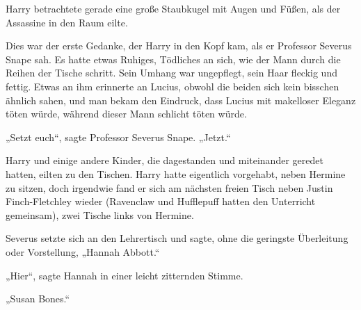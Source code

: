 Harry betrachtete gerade eine große Staubkugel mit Augen und Füßen, als der Assassine in den Raum eilte.

Dies war der erste Gedanke, der Harry in den Kopf kam, als er Professor Severus Snape sah. Es hatte etwas Ruhiges, Tödliches an sich, wie der Mann durch die Reihen der Tische schritt. Sein Umhang war ungepflegt, sein Haar fleckig und fettig. Etwas an ihm erinnerte an Lucius, obwohl die beiden sich kein bisschen ähnlich sahen, und man bekam den Eindruck, dass Lucius mit makelloser Eleganz töten würde, während dieser Mann schlicht töten würde.

„Setzt euch“, sagte Professor Severus Snape.
„Jetzt.“

Harry und einige andere Kinder, die dagestanden und miteinander geredet hatten, eilten zu den Tischen. Harry hatte eigentlich vorgehabt, neben Hermine zu sitzen, doch irgendwie fand er sich am nächsten freien Tisch neben Justin Finch-Fletchley wieder (Ravenclaw und Hufflepuff hatten den Unterricht gemeinsam), zwei Tische links von Hermine.

Severus setzte sich an den Lehrertisch und sagte, ohne die geringste Überleitung oder Vorstellung,
„Hannah Abbott.“

„Hier“, sagte Hannah in einer leicht zitternden Stimme.

„Susan Bones.“

